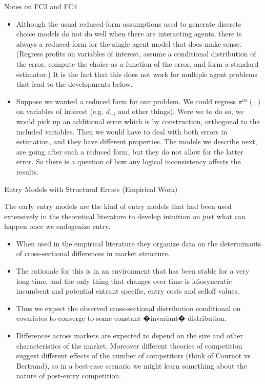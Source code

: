 \begin{frame}{Notes on FC3 and FC4}
\small
\begin{itemize}



\item Although the usual reduced-form assumptions used to generate discrete choice models do not do well when there are interacting agents, there is always a reduced-form for the single agent model that does make sense.  (Regress profits on variables of interest, assume a conditional distribution of the error, compute the choice as a function of the error, and form a standard estimator.)  It is the fact that this does not work for multiple agent problems that lead to the developments below.

\item Suppose we wanted a reduced form for our problem. We could regress $\pi^{as}(\cdot)$ on variables of interest (e.g. $d_{-i}$ and other things). Were we to do so, we would pick up an additional error which is by construction, orthogonal to the included variables. Then we would have to deal with both errors in estimation, and they have different properties. The models we describe next, are going after such a reduced form, but they do not allow for the latter error. So there is a question of how any logical inconsistency affects the results.

\end{itemize}

\end{frame}

\begin{frame}{Entry Models with Structural Errors (Empirical Work)}

\small
The early entry models are the kind of entry models that had been used extensively in the theoretical literature to develop intuition on just what can happen once we endogenize entry. 
\begin{itemize}
\item When used in the empirical literature they organize data on the determinants of cross-sectional differences in market structure.
\item The rationale for this is in an environment that has been stable for a very long time, and the only thing that changes over time is idiosyncratic incumbent and potential entrant specific, entry costs and selloff values. 
\item Thus we expect the observed cross-sectional distribution conditional on covariates to converge to some constant �invariant� distribution. 
\item Differences across markets are expected to depend on the size and other characteristics of the market. Moreover different theories of competition suggest different effects of the number of competitors (think of Cournot vs Bertrand), so in a best-case scenario we might learn something about the nature of post-entry competition.
\end{itemize}


\end{frame}

